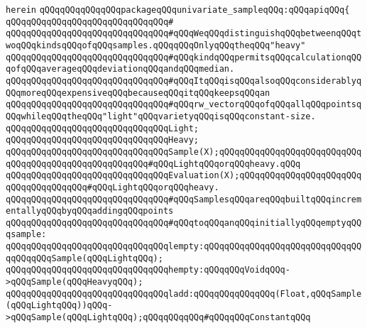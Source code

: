 \verb|herein|\newline
\newline
\verb|qQQqqQQqqQQqqQQqpackageqQQqunivariate_sampleqQQq:qQQqapiqQQq{|\newline
\verb|qQQqqQQqqQQqqQQqqQQqqQQqqQQqqQQq#|\newline
\verb|qQQqqQQqqQQqqQQqqQQqqQQqqQQqqQQq#qQQqWeqQQqdistinguishqQQqbetweenqQQqtwoqQQqkindsqQQqofqQQqsamples.qQQqqQQqOnlyqQQqtheqQQq"heavy"|\newline
\verb|qQQqqQQqqQQqqQQqqQQqqQQqqQQqqQQq#qQQqkindqQQqpermitsqQQqcalculationqQQqofqQQqaverageqQQqdeviationqQQqandqQQqmedian.|\newline
\verb|qQQqqQQqqQQqqQQqqQQqqQQqqQQqqQQq#qQQqItqQQqisqQQqalsoqQQqconsiderablyqQQqmoreqQQqexpensiveqQQqbecauseqQQqitqQQqkeepsqQQqan|\newline
\verb|qQQqqQQqqQQqqQQqqQQqqQQqqQQqqQQq#qQQqrw_vectorqQQqofqQQqallqQQqpointsqQQqwhileqQQqtheqQQq"light"qQQqvarietyqQQqisqQQqconstant-size.|\newline
\newline
\verb|qQQqqQQqqQQqqQQqqQQqqQQqqQQqqQQqLight;|\newline
\verb|qQQqqQQqqQQqqQQqqQQqqQQqqQQqqQQqHeavy;|\newline
\newline
\verb|qQQqqQQqqQQqqQQqqQQqqQQqqQQqqQQqSample(X);qQQqqQQqqQQqqQQqqQQqqQQqqQQqqQQqqQQqqQQqqQQqqQQqqQQqqQQq#qQQqLightqQQqorqQQqheavy.qQQq|\newline
\verb|qQQqqQQqqQQqqQQqqQQqqQQqqQQqqQQqEvaluation(X);qQQqqQQqqQQqqQQqqQQqqQQqqQQqqQQqqQQqqQQq#qQQqLightqQQqorqQQqheavy.|\newline
\newline
\newline
\verb|qQQqqQQqqQQqqQQqqQQqqQQqqQQqqQQq#qQQqSamplesqQQqareqQQqbuiltqQQqincrementallyqQQqbyqQQqaddingqQQqpoints|\newline
\verb|qQQqqQQqqQQqqQQqqQQqqQQqqQQqqQQq#qQQqtoqQQqanqQQqinitiallyqQQqemptyqQQqsample:|\newline
\newline
\verb|qQQqqQQqqQQqqQQqqQQqqQQqqQQqqQQqlempty:qQQqqQQqqQQqqQQqqQQqqQQqqQQqqQQqqQQqqQQqSample(qQQqLightqQQq);|\newline
\verb|qQQqqQQqqQQqqQQqqQQqqQQqqQQqqQQqhempty:qQQqqQQqVoidqQQq->qQQqSample(qQQqHeavyqQQq);|\newline
\newline
\verb|qQQqqQQqqQQqqQQqqQQqqQQqqQQqqQQqladd:qQQqqQQqqQQqqQQq(Float,qQQqSample(qQQqLightqQQq))qQQq->qQQqSample(qQQqLightqQQq);qQQqqQQqqQQq#qQQqqQQqConstantqQQq|\newline
